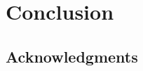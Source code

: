 \documentclass[twocolumn]{\docclass}
\begin{document}
	\section{Conclusion}
	\label{sec:conclusion}
	
	
	
	\subsection*{Acknowledgments}
	
	
	
	
	
	
	
	
	
	
	
	
\end{document}
